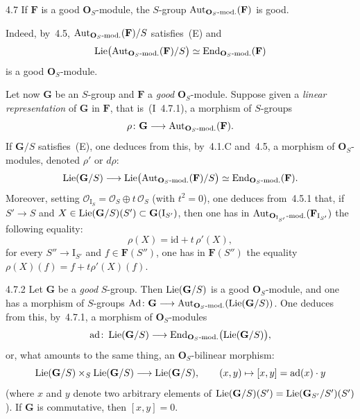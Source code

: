 \begin{theorem}{4.7}\label{II.4.7}
If \(\mathbf{F}\) is a good \(\mathbf{O}_{S}\)-module, the \(S\)-group
\(\operatorname{Aut}_{\mathbf{O}_{S}\textup{-mod.}}(\mathbf{F})\) is good.
\end{theorem}

{\renewcommand{\thefootnote}{(75)}}
Indeed, by~4.5, \(\operatorname{Aut}_{\mathbf{O}_{S}\textup{-mod.}}(\mathbf{F})/S\) satisfies~(E) and
\[
\operatorname{Lie}\bigl(\operatorname{Aut}_{\mathbf{O}_{S}\textup{-mod.}}(\mathbf{F})/S\bigr)
\simeq\operatorname{End}_{\mathbf{O}_{S}\textup{-mod.}}(\mathbf{F})
\]
is a good \(\mathbf{O}_{S}\)-module.

\label{II.4.7.1}
{\renewcommand{\thefootnote}{(76)}}
Let now \(\mathbf{G}\) be an \(S\)-group and \(\mathbf{F}\) a \emph{good}
\(\mathbf{O}_{S}\)-module. Suppose given a \emph{linear representation} of
\(\mathbf{G}\) in \(\mathbf{F}\), that is~(I~4.7.1), a morphism of \(S\)-groups
\[
\rho\colon\mathbf{G}\longrightarrow\operatorname{Aut}_{\mathbf{O}_{S}\textup{-mod.}}(\mathbf{F}).
\]
If \(\mathbf{G}/S\) satisfies~(E), one deduces from this, by~4.1.C and~4.5, a
morphism of \(\mathbf{O}_{S}\)-modules, denoted \(\rho'\) or \(d\rho\):
\[
\operatorname{Lie}(\mathbf{G}/S)\longrightarrow
\operatorname{Lie}\bigl(\operatorname{Aut}_{\mathbf{O}_{S}\textup{-mod.}}(\mathbf{F})/S\bigr)
\simeq\operatorname{End}_{\mathbf{O}_{S}\textup{-mod.}}(\mathbf{F}).
\]
{\renewcommand{\thefootnote}{(77)}}
Moreover, setting \(\mathcal{O}_{\mathrm{I}_{S}}=\mathcal{O}_{S}\oplus t\,\mathcal{O}_{S}\)
(with \(t^{2}=0\)), one deduces from~4.5.1 that, if \(S'\to S\) and
\(X\in\operatorname{Lie}(\mathbf{G}/S)(S')\subset\mathbf{G}(\mathrm{I}_{S'})\), then one has in
\(\operatorname{Aut}_{\mathbf{O}_{\mathrm{I}_{S'}}\textup{-mod.}}(\mathbf{F}_{\mathrm{I}_{S'}})\) the
following equality:
\begin{equation}
\rho(X)=\mathrm{id}+t\,\rho'(X),
\tag{*}
\end{equation}
\ie for every \(S''\to\mathrm{I}_{S'}\) and \(f\in\mathbf{F}(S'')\), one has in
\(\mathbf{F}(S'')\) the equality \(\rho(X)(f)=f+t\rho'(X)(f)\).

\begin{definition}{4.7.2}\label{II.4.7.2}
Let \(\mathbf{G}\) be a \emph{good} \(S\)-group. Then \(\operatorname{Lie}(\mathbf{G}/S)\) is a good
\(\mathbf{O}_{S}\)-module, and one has a morphism of \(S\)-groups
\(\operatorname{Ad}\colon\mathbf{G}\longrightarrow\operatorname{Aut}_{\mathbf{O}_{S}\textup{-mod.}}(\operatorname{Lie}(\mathbf{G}/S))\). One
deduces from this, by~4.7.1, a morphism of \(\mathbf{O}_{S}\)-modules
\[
\operatorname{ad}\colon\operatorname{Lie}(\mathbf{G}/S)\longrightarrow
\operatorname{End}_{\mathbf{O}_{S}\textup{-mod.}}\bigl(\operatorname{Lie}(\mathbf{G}/S)\bigr),
\]
or, what amounts to the same thing, an \(\mathbf{O}_{S}\)-bilinear morphism:
\[
\operatorname{Lie}(\mathbf{G}/S)\times_{S}\operatorname{Lie}(\mathbf{G}/S)\longrightarrow\operatorname{Lie}(\mathbf{G}/S),
\qquad
(x,y)\mapsto[x,y]=\operatorname{ad}(x)\cdot y
\]
(where \(x\) and \(y\) denote two arbitrary elements of
\(\operatorname{Lie}(\mathbf{G}/S)(S')=\operatorname{Lie}(\mathbf{G}_{S'}/S')(S')\)). If \(\mathbf{G}\) is
commutative, then \([x,y]=0\).
\end{definition}

